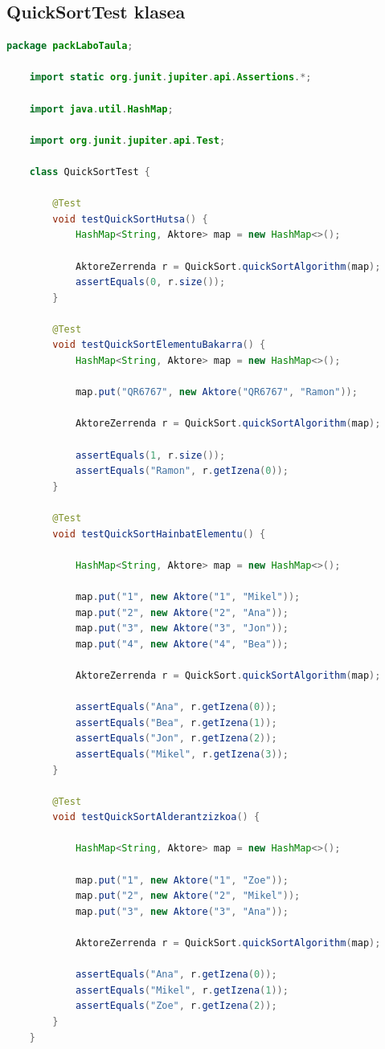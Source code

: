 \documentclass[a4paper,10pt]{report}
\begin{document}
	\subsection{QuickSortTest klasea}
\begin{lstlisting}[language=java]
	package packLaboTaula;
	
	import static org.junit.jupiter.api.Assertions.*;
	
	import java.util.HashMap;
	
	import org.junit.jupiter.api.Test;
	
	class QuickSortTest {
		
		@Test
		void testQuickSortHutsa() {
			HashMap<String, Aktore> map = new HashMap<>();
			
			AktoreZerrenda r = QuickSort.quickSortAlgorithm(map);
			assertEquals(0, r.size());
		}
		
		@Test
		void testQuickSortElementuBakarra() {
			HashMap<String, Aktore> map = new HashMap<>();
			
			map.put("QR6767", new Aktore("QR6767", "Ramon"));
			
			AktoreZerrenda r = QuickSort.quickSortAlgorithm(map);
			
			assertEquals(1, r.size());
			assertEquals("Ramon", r.getIzena(0));
		}
		
		@Test
		void testQuickSortHainbatElementu() {
			
			HashMap<String, Aktore> map = new HashMap<>();
			
			map.put("1", new Aktore("1", "Mikel"));
			map.put("2", new Aktore("2", "Ana"));
			map.put("3", new Aktore("3", "Jon"));
			map.put("4", new Aktore("4", "Bea"));
			
			AktoreZerrenda r = QuickSort.quickSortAlgorithm(map);
			
			assertEquals("Ana", r.getIzena(0));
			assertEquals("Bea", r.getIzena(1));
			assertEquals("Jon", r.getIzena(2));
			assertEquals("Mikel", r.getIzena(3));
		}
		
		@Test
		void testQuickSortAlderantzizkoa() {
			
			HashMap<String, Aktore> map = new HashMap<>();
			
			map.put("1", new Aktore("1", "Zoe"));
			map.put("2", new Aktore("2", "Mikel"));
			map.put("3", new Aktore("3", "Ana"));
			
			AktoreZerrenda r = QuickSort.quickSortAlgorithm(map);
			
			assertEquals("Ana", r.getIzena(0));
			assertEquals("Mikel", r.getIzena(1));
			assertEquals("Zoe", r.getIzena(2));
		}
	}
\end{lstlisting}
\end{document}

